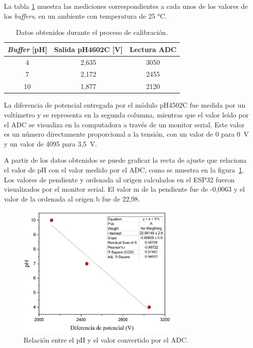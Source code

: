 La tabla \ref{tab:ensayoCalibracion} muestra las mediciones correspondientes a cada unos de los valores de los \textit{buffers}, en un ambiente con temperatura de 25 °C. 

\begin{table}[h]
	\centering
	\caption[Resultados calibración.]{Datos obtenidos durante el proceso de calibración.}
	\begin{tabular}{c c c }    
		\toprule
		\textbf{\textit{Buffer} [pH]} & \textbf{Salida pH4602C [V] }	&    \textbf{Lectura ADC}  \\
		\midrule
		4 	& 2,635 & 3050 \\		
		7	& 2,172 & 2455 \\
		10	& 1,877 & 2120 \\
		\bottomrule
		\hline
	\end{tabular}
	\label{tab:ensayoCalibracion}
\end{table}

La diferencia de potencial entregada por el módulo pH4502C fue medida por un voltímetro y se representa en la segunda columna, mientras que el valor leído por el ADC se visualiza en la computadora a través de un monitor serial. Este valor es un número directamente proporcional a la tensión, con un valor de 0 para 0~V y un valor de 4095 para 3,5~V.

A partir de los datos obtenidos se puede graficar la recta de ajuste que relaciona el valor de pH con el valor medido por el ADC, como se muestra en la figura~\ref{fig:rectaADC}. Los valores de pendiente y ordenada al origen calculados en el ESP32 fueron visualizados por el monitor serial. El valor m de la pendiente fue de -0,0063 y el valor de la ordenada al origen b fue de 22,98. 

\begin{figure}[htbp]
	\centering
	\includegraphics[width=0.7\textwidth]{./Figures/rectaADC.jpg}
	\caption{Relación entre el pH y el valor convertido por el ADC.}
	\label{fig:rectaADC}
\end{figure}

